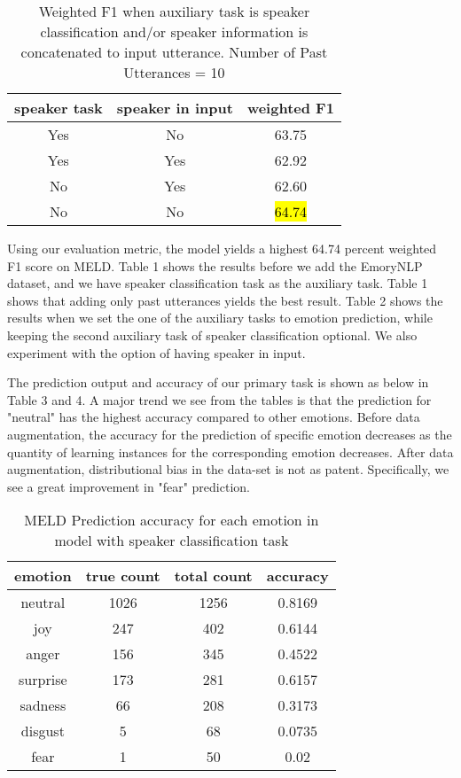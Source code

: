 \documentclass[11pt]{article}
\begin{document}
\begin{table}[hbt]
  \centering
  \begin{tabular}{c|c|c}
    speaker task & speaker in input & weighted F1 \\
    \hline
    Yes & No & 63.75 \\
    \hline
    Yes & Yes & 62.92 \\
    \hline
    No & Yes & 62.60 \\
    \hline
    No & No & \hl{64.74} \\
  \end{tabular}
  \caption{Weighted F1 when auxiliary task is speaker classification and/or speaker information is concatenated to input utterance. Number of Past Utterances = 10}
\end{table}

Using our evaluation metric, the model yields a highest 64.74 percent weighted F1 score on MELD. Table 1 shows the results before we add the EmoryNLP dataset, and we have speaker classification task as the auxiliary task. Table 1 shows that adding only past utterances yields the best result. Table 2 shows the results when we set the one of the auxiliary tasks to emotion prediction, while keeping the second auxiliary task of speaker classification optional. We also experiment with the option of having speaker in input.

The prediction output and accuracy of our primary task is shown as below in Table 3 and 4. A major trend we see from the tables is that the prediction for "neutral" has the highest accuracy compared to other emotions. Before data augmentation, the accuracy for the prediction of specific emotion decreases as the quantity of learning instances for the corresponding emotion decreases. After data augmentation, distributional bias in the data-set is not as patent. Specifically, we see a great improvement in "fear" prediction.

\begin{table}[hbt]
  \centering
  \begin{tabular}{c|c|c|c}
    emotion & true count & total count & accuracy \\
    \hline
    neutral & 1026 & 1256 & 0.8169 \\
    \hline
    joy & 247 & 402 & 0.6144 \\
    \hline
    anger & 156 & 345 & 0.4522  \\
    \hline
    surprise & 173 & 281 & 0.6157 \\
    \hline
    sadness & 66 & 208 & 0.3173 \\
    \hline
    disgust & 5 & 68 & 0.0735  \\
    \hline
    fear & 1 & 50 & 0.02 \\
  \end{tabular}
  \caption{MELD Prediction accuracy for each emotion in model with speaker classification task}
\end{table}
\end{document}
